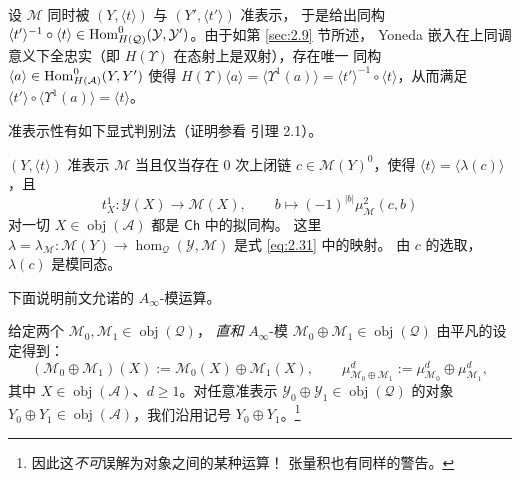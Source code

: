 \begin{Rem}\label{rem:3.10}
设 $\mathcal M$ 同时被 $(Y,\langle t\rangle)$ 与 $(Y',\langle t'\rangle)$ 准表示，
于是给出同构 $\langle t'\rangle^{-1}\circ\langle t\rangle\in
\operatorname{Hom}^0_{H(\mathcal Q)}(\mathcal Y,\mathcal Y')$。由于如第 \ref{sec:2.9} 节所述，
Yoneda 嵌入在上同调意义下全忠实（即 $H(\Upsilon)$ 在态射上是双射），存在唯一
同构 $\langle a\rangle\in\operatorname{Hom}^0_{H(\mathcal A)}(Y,Y')$ 使得
$H(\Upsilon)\langle a\rangle=\langle\Upsilon^1(a)\rangle=
\langle t'\rangle^{-1}\circ\langle t\rangle$，从而满足
$\langle t'\rangle\circ\langle\Upsilon^1(a)\rangle=\langle t\rangle$。
\end{Rem}

准表示性有如下显式判别法（证明参看 \cite{Sei08} 引理 2.1）。

\begin{Lem}\label{lem:3.11}
$(Y,\langle t\rangle)$ 准表示 $\mathcal M$ 当且仅当存在 0 次上闭链
$c\in\mathcal M(Y)^0$，使得 $\langle t\rangle=\langle\lambda(c)\rangle$，且
\[
  t^1_X:\mathcal Y(X)\to\mathcal M(X),\qquad b\longmapsto(-1)^{|b|}
  \mu^2_{\mathcal M}(c,b)
\]
对一切 $X\in\operatorname{obj}(\mathcal A)$ 都是 $\mathsf{Ch}$ 中的拟同构。
这里 $\lambda=\lambda_{\mathcal M}:\mathcal M(Y)\to
\hom_{\mathcal Q}(\mathcal Y,\mathcal M)$ 是式 \eqref{eq:2.31} 中的映射。
由 $c$ 的选取，$\lambda(c)$ 是模同态。
\end{Lem}

下面说明前文允诺的 $A_\infty$-模运算。

\begin{Def}\label{def:3.12}
给定两个 $\mathcal M_0,\mathcal M_1\in\operatorname{obj}(\mathcal Q)$，
\emph{直和} $A_\infty$-模 $\mathcal M_0\oplus\mathcal M_1\in
\operatorname{obj}(\mathcal Q)$ 由平凡的设定得到：
\[
  (\mathcal M_0\oplus\mathcal M_1)(X):=\mathcal M_0(X)\oplus\mathcal M_1(X),
  \qquad
  \mu^d_{\mathcal M_0\oplus\mathcal M_1}:=\mu^d_{\mathcal M_0}
  \oplus\mu^d_{\mathcal M_1},
\]
其中 $X\in\operatorname{obj}(\mathcal A)$、$d\ge 1$。对任意准表示
$\mathcal Y_0\oplus\mathcal Y_1\in\operatorname{obj}(\mathcal Q)$ 的对象
$Y_0\oplus Y_1\in\operatorname{obj}(\mathcal A)$，我们沿用记号
$Y_0\oplus Y_1$。\footnote{因此这\emph{不可}误解为对象之间的某种运算！
张量积也有同样的警告。}
\end{Def}

